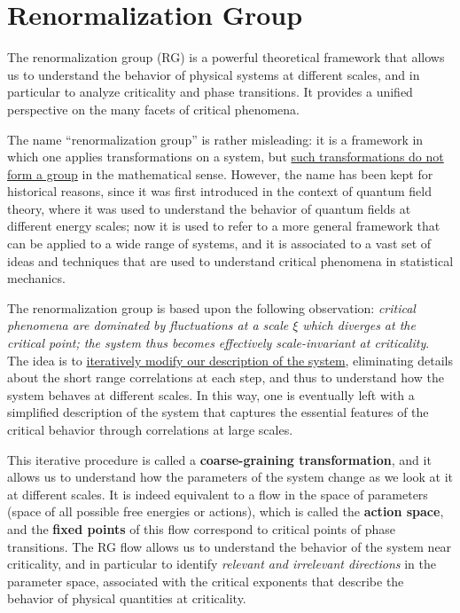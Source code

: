 \chapter{Renormalization Group}

The renormalization group (RG) is a powerful theoretical framework that allows us to understand the behavior of physical systems at different scales, and in particular to analyze criticality and phase transitions. It provides a unified perspective on the many facets of critical phenomena.

The name ``renormalization group'' is rather misleading: it is a framework in which one applies transformations on a system, but \uline{such transformations do not form a group} in the mathematical sense. However, the name has been kept for historical reasons, since it was first introduced in the context of quantum field theory, where it was used to understand the behavior of quantum fields at different energy scales; now it is used to refer to a more general framework that can be applied to a wide range of systems, and it is associated to a vast set of ideas and techniques that are used to understand critical phenomena in statistical mechanics.

The renormalization group is based upon the following observation: \textit{critical phenomena are dominated by fluctuations at a scale \(\xi\) which diverges at the critical point; the system thus becomes effectively scale-invariant at criticality}. The idea is to \uline{iteratively modify our description of the system}, eliminating details about the short range correlations at each step, and thus to understand how the system behaves at different scales. In this way, one is eventually left with a simplified description of the system that captures the essential features of the critical behavior through correlations at large scales.

This iterative procedure is called a \textbf{coarse-graining transformation}, and it allows us to understand how the parameters of the system change as we look at it at different scales. It is indeed equivalent to a flow in the space of parameters (space of all possible free energies or actions), which is called the \textbf{action space}, and the \textbf{fixed points} of this flow correspond to critical points of phase transitions. The RG flow allows us to understand the behavior of the system near criticality, and in particular to identify \textit{relevant and irrelevant directions} in the parameter space, associated with the critical exponents that describe the behavior of physical quantities at criticality.

